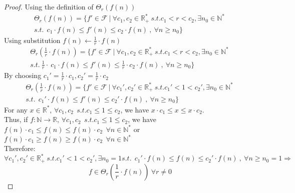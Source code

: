 \begin{proof}
    Using the definition of $ \Theta_{r}(f(n))$
    \[\begin{split} \Theta_{r}(f(n)) = \lbrace f' \in \mathcal{F}\ |\ \forall c_{1}, c_{2} \in \mathbb{R}^{*}_{+} \ s.t.  c_{1}< r < c_{2} , \exists n_{0} \in \mathbb{N}^{*}\ \\ s.t.\ \ c_{1} \cdot f(n) \leq f'(n) \leq c_{2} \cdot f(n)\ ,\  \forall n \geq n_{0} \rbrace \end{split} \]
    Using substitution $ f(n) \longleftarrow \frac{1}{r} \cdot f(n)$
    \[\begin{split} \Theta_{r} \left( \frac{1}{r} \cdot f(n) \right) = \lbrace f' \in \mathcal{F}\ |\ \forall c_{1}, c_{2} \in \mathbb{R}^{*}_{+} \ s.t.  c_{1}< r < c_{2} , \exists n_{0} \in \mathbb{N}^{*}\ \\ s.t.\ \frac{1}{r} \cdot \ c_{1} \cdot f(n) \leq  f'(n) \leq \frac{1}{r} \cdot c_{2} \cdot f(n)\ ,\  \forall n \geq n_{0} \rbrace \end{split} \]
    By choosing $c_{1}' = \frac{1}{r} \cdot c_{1}, c_{2}' = \frac{1}{r} \cdot c_{2}$
   \[\begin{split} \Theta_{r} \left( \frac{1}{r} \cdot f(n) \right) = \lbrace f' \in \mathcal{F}\ |\ \forall c_{1}', c_{2}' \in \mathbb{R}^{*}_{+} \ s.t.  c_{1}'< 1 < c_{2}' , \exists n_{0} \in \mathbb{N}^{*}\ \\ s.t.\  \ c_{1}' \cdot f(n) \leq  f'(n) \leq c_{2}' \cdot f(n)\ ,\  \forall n \geq n_{0} \rbrace \end{split} \]
	For any $x \in \mathbb{R}^{*}$,  $\forall c_{1}, c_{2}\ \ s.t.  c_{1} \leq 1 \leq c_{2}$, we have $ x \cdot c_{1} \leq x \leq x \cdot c_{2} $. \\
   	Thus, if $f:\mathbb{N}\longrightarrow\mathbb{R}$, $\forall c_{1}, c_{2}\ \  s.t.  c_{1} \leq 1 \leq c_{2}$, we have $f(n) \cdot c_{1} \leq f(n) \leq f(n) \cdot c_{2}\ \ \forall n \in \mathbb{N}^{*}$ or $f(n) \cdot c_{1} \geq f(n) \geq f(n) \cdot c_{2}\ \ \forall n \in \mathbb{N}^{*}$\\
   	Therefore:
   	\[\forall c_{1}', c_{2}' \in \mathbb{R}^{*}_{+} \ s.t.  c_{1}'< 1 < c_{2}' , \exists n_{0} = 1  s.t.\  \ c_{1}' \cdot f(n) \leq  f(n) \leq c_{2}' \cdot f(n)\ ,\  \forall n \geq n_{0}=1 \Rightarrow \]
   	\[ f \in \Theta_{r} \left( \frac{1}{r} \cdot f(n) \right)\ \forall r \neq 0 \]
\end{proof}
 
